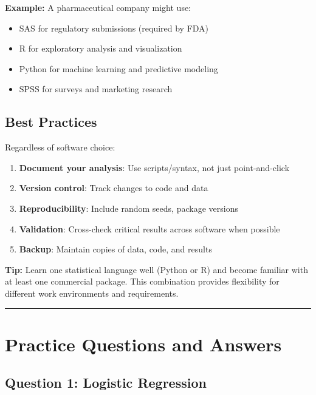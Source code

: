 \documentclass[
]{article}
\begin{document}
\textbf{Example: } A pharmaceutical company might use:

\begin{itemize}
\item
  SAS for regulatory submissions (required by FDA)
\item
  R for exploratory analysis and visualization
\item
  Python for machine learning and predictive modeling
\item
  SPSS for surveys and marketing research
\end{itemize}

\textbf{ }

\subsection{Best Practices}

Regardless of software choice:

\begin{enumerate}
\item
  \textbf{Document your analysis}: Use scripts/syntax, not just
  point-and-click
\item
  \textbf{Version control}: Track changes to code and data
\item
  \textbf{Reproducibility}: Include random seeds, package versions
\item
  \textbf{Validation}: Cross-check critical results across software when
  possible
\item
  \textbf{Backup}: Maintain copies of data, code, and results
\end{enumerate}

\textbf{Tip: } Learn one statistical language well (Python or R) and
become familiar with at least one commercial package. This combination
provides flexibility for different work environments and requirements.

\begin{center}\rule{0.5\linewidth}{0.5pt}\end{center}

\textbf{ }

\section{Practice Questions and Answers}

\textbf{ }

\subsection{Question 1: Logistic Regression}
\end{document}
